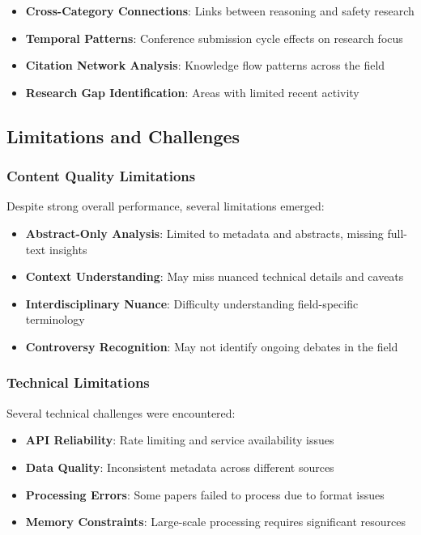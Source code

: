 \begin{itemize}
    \item \textbf{Cross-Category Connections}: Links between reasoning and safety research
    \item \textbf{Temporal Patterns}: Conference submission cycle effects on research focus
    \item \textbf{Citation Network Analysis}: Knowledge flow patterns across the field
    \item \textbf{Research Gap Identification}: Areas with limited recent activity
\end{itemize}

\subsection{Limitations and Challenges}

\subsubsection{Content Quality Limitations}

Despite strong overall performance, several limitations emerged:

\begin{itemize}
    \item \textbf{Abstract-Only Analysis}: Limited to metadata and abstracts, missing full-text insights
    \item \textbf{Context Understanding}: May miss nuanced technical details and caveats
    \item \textbf{Interdisciplinary Nuance}: Difficulty understanding field-specific terminology
    \item \textbf{Controversy Recognition}: May not identify ongoing debates in the field
\end{itemize}

\subsubsection{Technical Limitations}

Several technical challenges were encountered:

\begin{itemize}
    \item \textbf{API Reliability}: Rate limiting and service availability issues
    \item \textbf{Data Quality}: Inconsistent metadata across different sources
    \item \textbf{Processing Errors}: Some papers failed to process due to format issues
    \item \textbf{Memory Constraints}: Large-scale processing requires significant resources
\end{itemize}

